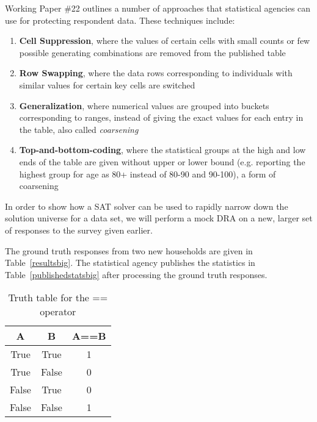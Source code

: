 Working Paper \#22 outlines a number of approaches that statistical
agencies can use for protecting respondent data. These techniques include:
\begin{enumerate}
  \item \textbf{Cell Suppression}, where the values of certain  cells with small counts or few possible
        generating combinations are removed from the published table
  \item \textbf{Row Swapping}, where the data rows corresponding to individuals
        with similar values for certain key cells are switched
  \item \textbf{Generalization}, where numerical values are grouped into
        buckets corresponding to ranges, instead of giving the exact
        values for each entry in the table, also called \emph{coarsening}
  \item \textbf{Top-and-bottom-coding}, where the statistical groups at the high and low ends
        of the table are given without upper or lower bound (e.g.
        reporting the highest group for age as 80+ instead of
        80-90 and 90-100), a form of coarsening
\end{enumerate}



In order to show how a SAT solver can be used to rapidly narrow down the solution universe for a data set, we will perform a mock DRA on a new, larger set of responses to the survey given earlier.

The ground truth responses from two new households are given in Table~\ref{resultsbig}. The statistical agency publishes the statistics in Table~\ref{publishedstatsbig} after processing the ground truth responses.


\begin{table}[t]
\begin{center}
\begin{tabular}{cc|c}
A & B & A==B  \\
\hline
True & True & 1   \\
True & False & 0  \\
False & True & 0  \\
False & False & 1  \\
\hline
\end{tabular}
\caption{Truth table for the == operator}\label{truthtable}
\end{center}
\end{table}






